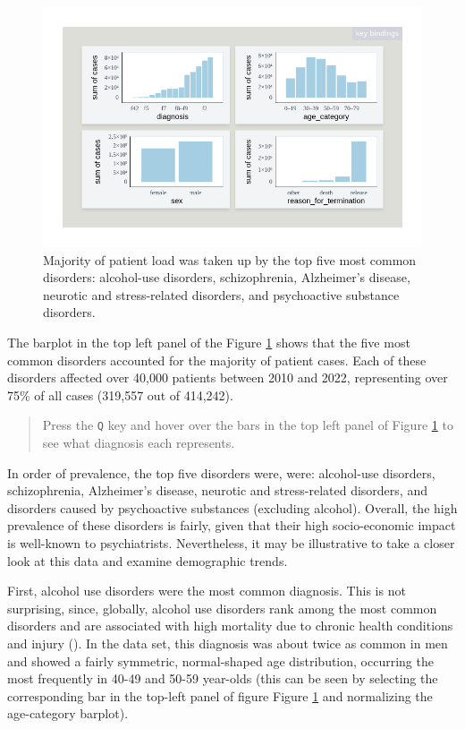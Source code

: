 \documentclass[
]{book}
\theoremstyle{definition}
\theoremstyle{definition}
\theoremstyle{definition}
\theoremstyle{definition}
\theoremstyle{remark}
\begin{document}
\begin{figure}

{\centering \includegraphics[width=1\linewidth,height=1\textheight]{./figures/example-cases-diagnosis} 

}

\caption{Majority of patient load was taken up by the top five most common disorders: alcohol-use disorders, schizophrenia, Alzheimer's disease, neurotic and stress-related disorders, and psychoactive substance disorders.}\label{fig:example-cases-diagnosis}
\end{figure}

The barplot in the top left panel of the Figure \ref{fig:example-cases-diagnosis} shows that the five most common disorders accounted for the majority of patient cases. Each of these disorders affected over 40,000 patients between 2010 and 2022, representing over 75\% of all cases (319,557 out of 414,242).

\begin{quote}
Press the \texttt{Q} key and hover over the bars in the top left panel of Figure \ref{fig:example-cases-diagnosis} to see what diagnosis each represents.
\end{quote}

In order of prevalence, the top five disorders were, were: alcohol-use disorders, schizophrenia, Alzheimer's disease, neurotic and stress-related disorders, and disorders caused by psychoactive substances (excluding alcohol). Overall, the high prevalence of these disorders is fairly, given that their high socio-economic impact is well-known to psychiatrists. Nevertheless, it may be illustrative to take a closer look at this data and examine demographic trends.

First, alcohol use disorders were the most common diagnosis. This is not surprising, since, globally, alcohol use disorders rank among the most common disorders and are associated with high mortality due to chronic health conditions and injury (). In the data set, this diagnosis was about twice as common in men and showed a fairly symmetric, normal-shaped age distribution, occurring the most frequently in 40-49 and 50-59 year-olds (this can be seen by selecting the corresponding bar in the top-left panel of figure Figure \ref{fig:example-cases-diagnosis} and normalizing the age-category barplot).
\end{document}
